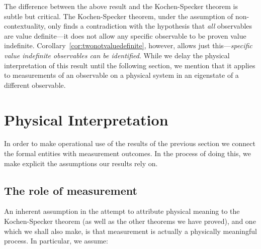 \documentclass[%
 preprint,
 showpacs,
 showkeys,
 amsmath,
 amssymb,
 aps,
 pra,
 ]{revtex4-1}
\theoremstyle{definition}
\begin{document}
The difference between the above result and the Kochen-Specker theorem is subtle but critical.
The Kochen-Specker theorem, under the assumption of non-contextuality, only finds a contradiction with the hypothesis that \emph{all} observables are value definite---it does not allow any specific observable to be proven value indefinite.
Corollary~\ref{cor:twonotvaluedefinite}, however, allows just this---{\em specific value indefinite observables can be identified}.
While we delay the physical interpretation of this result until the following section, we mention that it applies to measurements of an observable on a physical system in an eigenstate of a different observable.

\section{Physical Interpretation}
\label{sec:interpretation}


In order to make operational use  of the results of the previous section
we connect the formal entities with measurement outcomes.
In the process of doing this, we make explicit the assumptions our results rely on.

\subsection{The role of measurement}

An inherent assumption in the attempt to attribute physical meaning to the Kochen-Specker theorem (as well as the other theorems we have proved), and one which we shall also make, is that measurement is actually a physically meaningful process.
In particular, we assume:\\
\end{document}
